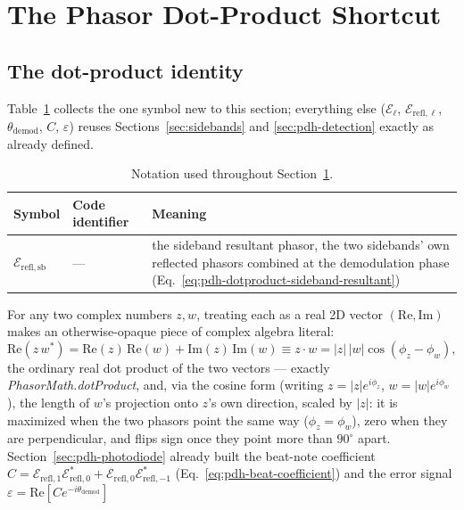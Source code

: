 \documentclass[9pt]{article}
\begin{document}
\section{The Phasor Dot-Product Shortcut}
\label{sec:pdh-dotproduct}
\subsection{The dot-product identity}
\label{sec:pdh-dotproduct-derivation}
Table~\ref{tab:pdh-dotproduct-glossary} collects the one symbol new to this
section; everything else ($\mathcal{E}_\ell$, $\mathcal{E}_{\mathrm{refl},\ell}$,
$\theta_{\mathrm{demod}}$, $C$, $\varepsilon$) reuses
Sections~\ref{sec:sidebands} and \ref{sec:pdh-detection} exactly as already
defined.
\begin{table}[H]
\centering
\small
\begin{tabular}{@{}llp{7cm}@{}}
\toprule
Symbol & Code identifier & Meaning \\
\midrule
$\mathcal{E}_{\mathrm{refl,sb}}$ & --- & the sideband resultant phasor, the two sidebands' own reflected phasors combined at the demodulation phase (Eq.~\eqref{eq:pdh-dotproduct-sideband-resultant}) \\
\bottomrule
\end{tabular}
\caption{Notation used throughout Section~\ref{sec:pdh-dotproduct}.}
\label{tab:pdh-dotproduct-glossary}
\end{table}
For any two complex numbers $z,w$, treating each as a real 2D vector
$(\mathrm{Re},\mathrm{Im})$ makes an otherwise-opaque piece of complex
algebra literal:
\begin{equation}
\mathrm{Re}(z\,w^*) = \mathrm{Re}(z)\,\mathrm{Re}(w) + \mathrm{Im}(z)\,\mathrm{Im}(w) \equiv z\cdot w = |z|\,|w|\cos(\phi_z-\phi_w),
\label{eq:pdh-dotproduct-lemma}
\end{equation}
the ordinary real dot product of the two vectors --- exactly
\textit{PhasorMath.dotProduct}, and, via the cosine form (writing
$z=|z|e^{i\phi_z}$, $w=|w|e^{i\phi_w}$), the length of $w$'s projection onto
$z$'s own direction, scaled by $|z|$: it is maximized when the two phasors
point the same way ($\phi_z=\phi_w$), zero when they are perpendicular, and
flips sign once they point more than $90^\circ$ apart. Section~\ref{sec:pdh-photodiode} already
built the beat-note coefficient
$C=\mathcal{E}_{\mathrm{refl},1}\mathcal{E}_{\mathrm{refl},0}^*+\mathcal{E}_{\mathrm{refl},0}\mathcal{E}_{\mathrm{refl},-1}^*$
(Eq.~\eqref{eq:pdh-beat-coefficient}) and the error signal
$\varepsilon=\mathrm{Re}[Ce^{-i\theta_{\mathrm{demod}}}]$
\end{document}
